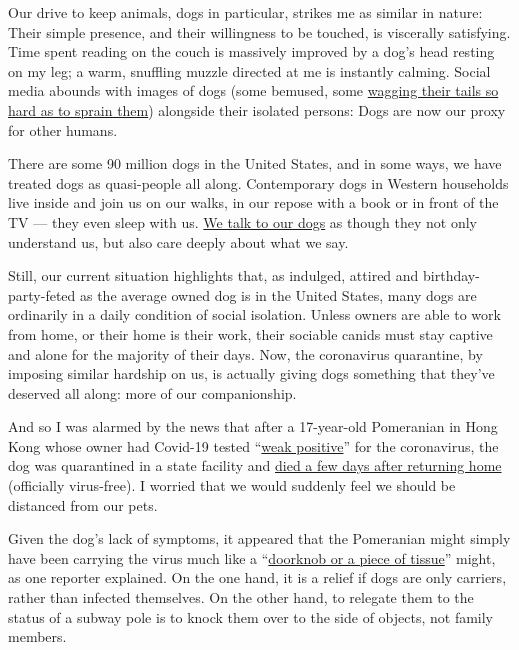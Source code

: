Our drive to keep animals, dogs in particular, strikes me as similar in
nature: Their simple presence, and their willingness to be touched, is
viscerally satisfying. Time spent reading on the couch is massively
improved by a dog's head resting on my leg; a warm, snuffling muzzle
directed at me is instantly calming. Social media abounds with images of
dogs (some bemused, some
\href{https://twitter.com/Emmasmith77xx/status/1240952373113208832?s=20}{wagging
their tails so hard as to sprain them}) alongside their isolated
persons: Dogs are now our proxy for other humans.

There are some 90 million dogs in the United States, and in some ways,
we have treated dogs as quasi-people all along. Contemporary dogs in
Western households live inside and join us on our walks, in our repose
with a book or in front of the TV --- they even sleep with us.
\href{https://www.nytimes3xbfgragh.onion/2019/08/02/opinion/sunday/talking-dog.html}{We
talk to our dogs} as though they not only understand us, but also care
deeply about what we say.

Still, our current situation highlights that, as indulged, attired and
birthday-party-feted as the average owned dog is in the United States,
many dogs are ordinarily in a daily condition of social isolation.
Unless owners are able to work from home, or their home is their work,
their sociable canids must stay captive and alone for the majority of
their days. Now, the coronavirus quarantine, by imposing similar
hardship on us, is actually giving dogs something that they've deserved
all along: more of our companionship.

And so I was alarmed by the news that after a 17-year-old Pomeranian in
Hong Kong whose owner had Covid-19 tested
``\href{https://www.scmp.com/news/hong-kong/health-environment/article/3075650/first-dog-found-coronavirus-has-died-after}{weak
positive}'' for the coronavirus, the dog was quarantined in a state
facility and
\href{https://coconuts.co/hongkong/news/hong-kong-pomeranian-that-tested-positive-for-covid-19-dies-after-returning-home/}{died
a few days after returning home} (officially virus-free). I worried that
we would suddenly feel we should be distanced from our pets.

Given the dog's lack of symptoms, it appeared that the Pomeranian might
simply have been carrying the virus much like a
``\href{https://www.scmp.com/news/hong-kong/article/3053026/careful-you-can-still-catch-coronavirus-your-dog-even-if-it-not?utm_medium=email\&utm_source=mailchimp\&utm_campaign=enlz-OpinionDaily\&utm_content=20200301\&MCUID=e0a9ed7cd8\&MCCampaignID=5f452d4331\&}{doorknob
or a piece of tissue}'' might, as one reporter explained. On the one
hand, it is a relief if dogs are only carriers, rather than infected
themselves. On the other hand, to relegate them to the status of a
subway pole is to knock them over to the side of objects, not family
members.

